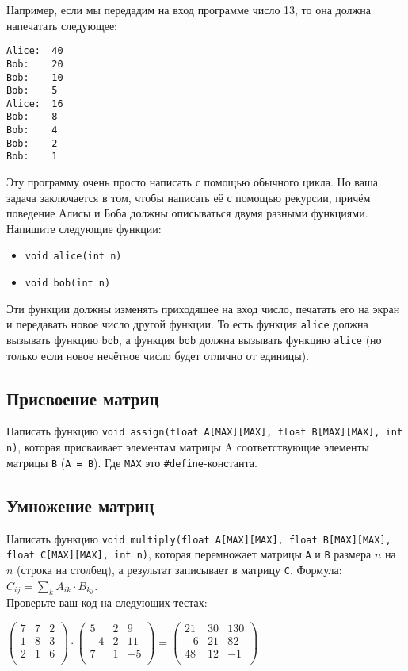 \documentclass[10pt]{article}
\begin{document}
Например, если мы передадим на вход программе число 13, то она должна напечатать следующее:

\begin{verbatim}
Alice:  40
Bob:    20
Bob:    10
Bob:    5
Alice:  16
Bob:    8
Bob:    4
Bob:    2
Bob:    1
\end{verbatim}

Эту программу очень просто написать с помощью обычного цикла. Но ваша задача заключается в том, чтобы написать её с помощью рекурсии, причём поведение Алисы и Боба должны описываться двумя разными функциями. Напишите следующие функции:

\begin{itemize}
\item \texttt{void alice(int n)}
\item \texttt{void bob(int n)}
\end{itemize}

Эти функции должны изменять приходящее на вход число, печатать его на экран и передавать новое число другой функции. То есть функция \texttt{alice} должна вызывать функцию \texttt{bob}, а функция \texttt{bob} должна вызывать функцию \texttt{alice} (но только если новое нечётное число будет отлично от единицы).


\subsection{Присвоение матриц}
Написать функцию \texttt{void assign(float A[MAX][MAX], float B[MAX][MAX], int n)}, которая присваивает элементам матрицы A соответствующие элементы матрицы \texttt{B} (\texttt{A = B}). Где \texttt{MAX} это \texttt{\#define}-константа.


\subsection{Умножение матриц}
Написать функцию \texttt{void multiply(float A[MAX][MAX], float B[MAX][MAX], float C[MAX][MAX], int n)}, которая перемножает матрицы \texttt{A} и \texttt{B} размера $n$ на $n$ (строка на столбец), а результат записывает в матрицу \texttt{C}. Формула: $C_{ij} = \sum\limits_k A_{ik} \cdot B_{kj}$. \\
Проверьте ваш код на следующих тестах:

\begin{center}
$\begin{pmatrix}
7 & 7 & 2 \\
1 & 8 & 3 \\
2 & 1 & 6 \\
\end{pmatrix} \cdot 
\begin{pmatrix}
5 & 2 & 9 \\
-4 & 2 & 11 \\
7 & 1 & -5 \\
\end{pmatrix}=
\begin{pmatrix}
21 & 30 & 130 \\
-6 & 21 & 82 \\
48 & 12 & -1 \\
\end{pmatrix}
$
\end{center}
\end{document}
